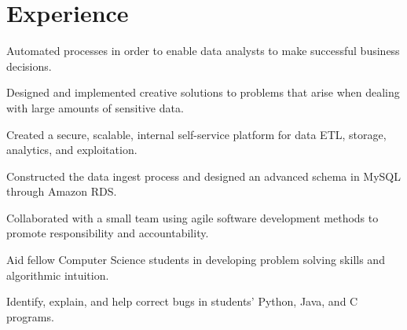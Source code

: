 \documentclass{resume}
\begin{document}
\begin{minipage}[t]{0.33\textwidth}
%
%

\end{minipage}
\hfill
\begin{minipage}[t]{0.66\textwidth}


\section{Experience}

\vspace{1.25\topsep} %
\begin{tightemize}
\item Automated processes in order to enable data analysts to make successful business decisions.
\item Designed and implemented creative solutions to problems that arise when dealing with large amounts of sensitive data.
\end{tightemize}
\sectionsep
\sectionsep

\begin{tightemize}
\item Created a secure, scalable, internal self-service platform for data ETL, storage, analytics, and exploitation.
\item Constructed the data ingest process and designed an advanced schema in MySQL through Amazon RDS.
\item Collaborated with a small team using agile software development methods to promote responsibility and accountability.
\end{tightemize}
\sectionsep
\sectionsep


\begin{tightemize}
\item Aid fellow Computer Science students in developing problem solving skills and algorithmic intuition.
\item Identify, explain, and help correct bugs in students’ Python, Java, and C programs.
\end{tightemize}
\sectionsep
\sectionsep


\end{minipage}
\end{document}
